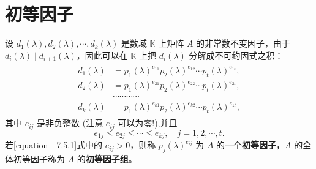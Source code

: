 \documentclass[../../main.tex]{subfiles}
\begin{document}
\section{初等因子}

\begin{definition}[初等因子]
设 $d_1(\lambda),d_2(\lambda),\cdots,d_k(\lambda)$ 是数域 $\mathbb{K}$ 上矩阵 $A$ 的非常数不变因子，由于 $d_i(\lambda)\mid d_{i + 1}(\lambda)$，因此可以在 $\mathbb{K}$ 上把 $d_i(\lambda)$ 分解成不可约因式之积：
\begin{gather}\label{equation---7.5.1}
\begin{aligned}
d_1(\lambda)&=p_1(\lambda)^{e_{11}}p_2(\lambda)^{e_{12}}\cdots p_t(\lambda)^{e_{1t}},\\
d_2(\lambda)&=p_1(\lambda)^{e_{21}}p_2(\lambda)^{e_{22}}\cdots p_t(\lambda)^{e_{2t}},\\
&\cdots\cdots\cdots\cdots\\
d_k(\lambda)&=p_1(\lambda)^{e_{k1}}p_2(\lambda)^{e_{k2}}\cdots p_t(\lambda)^{e_{kt}},
\end{aligned}
\end{gather}
其中 $e_{ij}$ 是非负整数 (注意 $e_{ij}$ 可以为零!),并且
\[
e_{1j}\leqslant  e_{2j}\leqslant \cdots\leqslant  e_{kj},\quad j = 1, 2, \cdots, t.
\]
若\eqref{equation---7.5.1}式中的 $e_{ij}>0$，则称 $p_j(\lambda)^{e_{ij}}$ 为 $A$ 的一个\textbf{初等因子}，$A$ 的全体初等因子称为 $A$ 的\textbf{初等因子组}。 
\end{definition}
\end{document}

